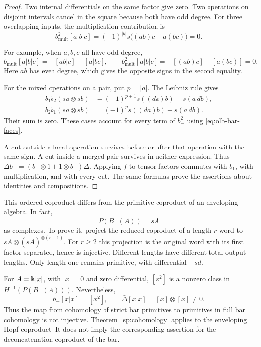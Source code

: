 \begin{proof}
Two internal differentials on the same factor give zero.
Two operations on disjoint intervals cancel in the square because
both have odd degree.
For three overlapping inputs, the multiplication contribution is
\[
 b_{\mathrm{mult}}^2[a|b|c]
 =(-1)^{|b|}s\bigl((ab)c-a(bc)\bigr)=0.
\]

For example, when $a,b,c$ all have odd degree,
\[
 b_{\mathrm{mult}}[a|b|c]=-[ab|c]-[a|bc],\qquad
 b_{\mathrm{mult}}^2[a|b|c]=-[(ab)c]+[a(bc)]=0.
\]
Here $ab$ has even degree, which gives the opposite signs in the
second equality.

For the mixed operations on a pair, put $p=|a|$. The Leibniz rule gives
\begin{align*}
 b_1b_2(sa\otimes sb)&=(-1)^{p+1}s((da)b)-s(a\,db),\\
 b_2b_1(sa\otimes sb)&=(-1)^ps((da)b)+s(a\,db).
\end{align*}
Their sum is zero.
These cases account for every term of $b_-^2$ using
\eqref{eq:olb-bar-faces}.

A cut outside a local operation survives before or after that
operation with the same sign.
A cut inside a merged pair survives in neither expression.
Thus $\Delta b_-=(b_-\otimes1+1\otimes b_-)\Delta$.
Applying $f$ to tensor factors commutes with $b_1$, with multiplication,
and with every cut.  The same formulas prove the assertions about
identities and compositions.
\end{proof}

This ordered coproduct differs from the primitive coproduct of an
enveloping algebra.  In fact,
\begin{equation}
 P(B_-(A))=s\bar A
 \label{eq:olb-bar-primitives}
\end{equation}
as complexes.  To prove it, project the reduced coproduct of a
length-$r$ word to $s\bar A\otimes(s\bar A)^{\otimes(r-1)}$.
For $r\geq2$ this projection is the original word with its first
factor separated, hence is injective.
Different lengths have different total output lengths.
Only length one remains primitive, with differential $-sd$.

For $A=\Bbbk[x]$, with $|x|=0$ and zero differential,
$[x^2]$ is a nonzero class in $H^{-1}(P(B_-(A)))$.
Nevertheless,
\[
 b_-[x|x]=[x^2],\qquad
 \bar\Delta[x|x]=[x]\otimes[x]\ne0.
\]
Thus the map from cohomology of strict bar primitives to primitives
in full bar cohomology is not injective.
Theorem~\ref{sp:cohomology} applies to the enveloping Hopf
coproduct. It does not imply the corresponding assertion for the
deconcatenation coproduct of the bar.

